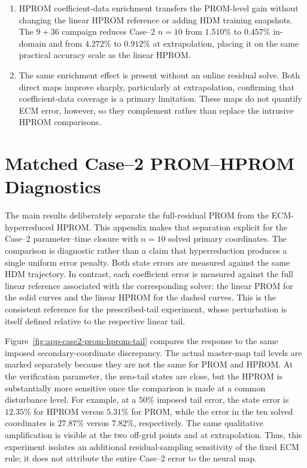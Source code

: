 \documentclass[11pt]{article}
\begin{document}
\begin{enumerate}
  residual feedback, not solely reconstruction error, while the matched-rule sweep shows improvement only once
  a sufficiently large primary block is solved.
  \item HPROM coefficient-data enrichment transfers the PROM-level gain without changing the linear HPROM reference
  or adding HDM training snapshots.  The \(9+36\) campaign reduces Case--2 \(n=10\) from \(1.510\%\) to \(0.457\%\)
  in-domain and from \(4.272\%\) to \(0.912\%\) at extrapolation, placing it on the same practical accuracy scale as
  the linear HPROM.
  \item The same enrichment effect is present without an online residual solve.  Both direct maps improve sharply,
  particularly at extrapolation, confirming that coefficient-data coverage is a primary limitation.  These maps do
  not quantify ECM error, however, so they complement rather than replace the intrusive HPROM comparisons.
\end{enumerate}



\appendix

\section{Matched Case--2 PROM--HPROM Diagnostics}
\label{app:case2-prom-hprom-diagnostics}

The main results deliberately separate the full-residual PROM from the
ECM-hyperreduced HPROM.  This appendix makes that separation explicit for the
Case--2 parameter--time closure with \(n=10\) solved primary coordinates.  The
comparison is diagnostic rather than a claim that hyperreduction produces a
single uniform error penalty.  Both state errors are measured against the same
HDM trajectory.  In contrast, each coefficient error is measured against the
full linear reference associated with the corresponding solver: the linear
PROM for the solid curves and the linear HPROM for the dashed curves.  This is
the consistent reference for the prescribed-tail experiment, whose
perturbation is itself defined relative to the respective linear tail.

Figure~\ref{fig:app-case2-prom-hprom-tail} compares the response to the same
imposed secondary-coordinate discrepancy.  The actual master-map tail levels
are marked separately because they are not the same for PROM and HPROM.  At
the verification parameter, the zero-tail states are close, but the HPROM is
substantially more sensitive once the comparison is made at a common
disturbance level.  For example, at a \(50\%\) imposed tail error, the state
error is \(12.35\%\) for HPROM versus \(5.31\%\) for PROM, while the error in
the ten solved coordinates is \(27.87\%\) versus \(7.82\%\), respectively.
The same qualitative amplification is visible at the two off-grid points and
at extrapolation.  Thus, this experiment isolates an additional
residual-sampling sensitivity of the fixed ECM rule; it does not attribute the
entire Case--2 error to the neural map.
\end{document}
